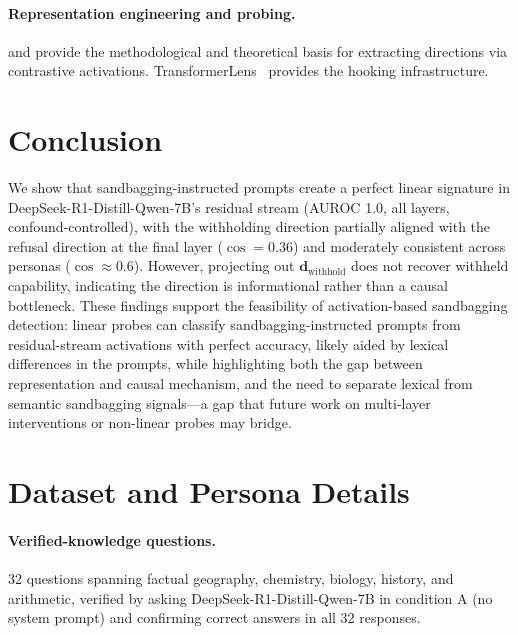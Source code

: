 \documentclass{article}
\begin{document}
\paragraph{Representation engineering and probing.}
\citet{zou2023representation} and \citet{park2024linear} provide the methodological and theoretical basis for extracting directions via contrastive activations.
TransformerLens~\citep{nanda2022transformerlens} provides the hooking infrastructure.

\section{Conclusion}
\label{sec:conclusion}

We show that sandbagging-instructed prompts create a perfect linear signature in DeepSeek-R1-Distill-Qwen-7B's residual stream (AUROC 1.0, all layers, confound-controlled), with the withholding direction partially aligned with the refusal direction at the final layer ($\cos = 0.36$) and moderately consistent across personas ($\cos \approx 0.6$).
However, projecting out $\mathbf{d}_{\text{withhold}}$ does not recover withheld capability, indicating the direction is informational rather than a causal bottleneck.
These findings support the feasibility of activation-based sandbagging detection: linear probes can classify sandbagging-instructed prompts from residual-stream activations with perfect accuracy, likely aided by lexical differences in the prompts, while highlighting both the gap between representation and causal mechanism, and the need to separate lexical from semantic sandbagging signals---a gap that future work on multi-layer interventions or non-linear probes may bridge.




\appendix

\section{Dataset and Persona Details}
\label{app:data}

\paragraph{Verified-knowledge questions.}
32 questions spanning factual geography, chemistry, biology, history, and arithmetic, verified by asking DeepSeek-R1-Distill-Qwen-7B in condition A (no system prompt) and confirming correct answers in all 32 responses.
\end{document}
